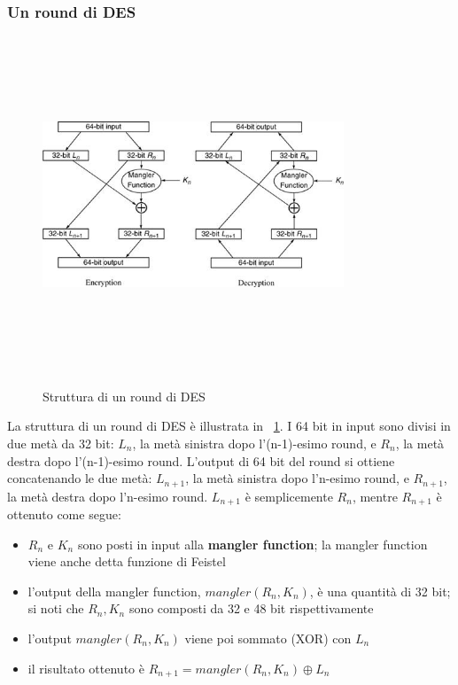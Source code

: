 \subsubsection{Un round di DES}
\begin{figure}[htbp]
	\centering%
	\subfigure%
	{\includegraphics[height=10cm, width=9cm, keepaspectratio]{Immagini/chiave_segreta/round_des.png}}
	\caption{Struttura di un round di DES \label{fig:round_des}} 	
\end{figure}
La struttura di un round di DES è illustrata in \figurename~\ref{fig:round_des}. I 64 bit in input sono divisi in due metà da 32 bit: $L_{n}$, la metà sinistra dopo l'(n-1)-esimo round, e $R_{n}$, la metà destra dopo l'(n-1)-esimo round. L'output di 64 bit del round si ottiene concatenando le due metà: $L_{n + 1}$, la metà sinistra dopo l'n-esimo round, e $R_{n + 1}$, la metà destra dopo l'n-esimo round. $L_{n+1}$ è semplicemente $R_{n}$, mentre $R_{n + 1}$ è ottenuto come segue:
\begin{itemize}
  \item $R_{n}$ e $K_{n}$ sono posti in input alla \textbf{mangler function}; la mangler function viene anche detta funzione di Feistel
  \item l'output della mangler function, $mangler(R_{n}, K_{n})$, è una quantità di 32 bit; si noti che $R_{n}, K_{n}$ sono composti da
32 e 48 bit rispettivamente
  \item l'output $mangler(R_{n}, K_{n})$ viene poi sommato (XOR) con $L_{n}$
  \item il risultato ottenuto è $R_{n+1} = mangler(R_{n}, K_{n}) \oplus L_{n}$
\end{itemize}
